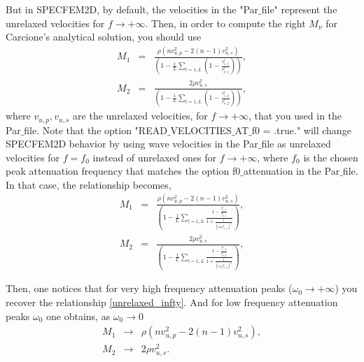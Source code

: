 \documentclass[a4paper,12pt]{article}
\begin{document}
But in SPECFEM2D, by default, the velocities in the "Par$\_$file" represent the unrelaxed velocities for $f\rightarrow+\infty$. Then, in order to compute the right $M_\nu$ for Carcione's analytical solution, you should use
\begin{equation}
\begin{array}{rcl}
M_1 &=& \frac{\rho(nv_{u,p}^2-2(n-1)v_{u,s}^2)}{\left(1-\frac{1}{L}\sum_{l=1,L}(1-\frac{\tau^l_{\epsilon,1}}{\tau^l_{\sigma,1}})\right)},\\
M_2 &=& \frac{2\rho v_{u,s}^2}{\left(1-\frac{1}{L}\sum_{l=1,L}(1-\frac{\tau^l_{\epsilon,2}}{\tau^l_{\sigma,2}})\right)},
\end{array}
\label{unrelaxed_infty}
\end{equation}
where $v_{u,p}, v_{u,s}$ are the unrelaxed velocities, for $f\rightarrow+\infty$, that you used in the Par$\_$file. Note that the option "READ$\_$VELOCITIES$\_$AT$\_$f0 = .true." will change SPECFEM2D behavior by using wave velocities in the Par$\_$file as unrelaxed velocities for $f = f_0$ instead of unrelaxed ones for $f\rightarrow +\infty$, where $f_0$ is the chosen peak attenuation frequency that matches the option f0$\_$attenuation in the Par$\_$file. In that case, the relationship becomes,
\begin{equation}
\begin{array}{rcl}
M_1 &=& \frac{\rho(nv_{u,p}^2-2(n-1)v_{u,s}^2)}{(1 - \frac{1}{L}\sum_{l=1,L}\frac{1-\frac{\tau^l_{\epsilon,1}}{\tau^l_{\sigma,1}}}{1+\frac{1}{(\omega_0\tau^l_{\sigma,1})^2}})},\\
M_2 &=& \frac{2\rho v_{u,s}^2}{(1 - \frac{1}{L}\sum_{l=1,L}\frac{1-\frac{\tau^l_{\epsilon,2}}{\tau^l_{\sigma,2}}}{1+\frac{1}{(\omega_0\tau^l_{\sigma,2})^2}})},
\end{array}
\end{equation}

Then, one notices that for very high frequency attenuation peaks ($\omega_0 \rightarrow +\infty$) you recover the relationship \eqref{unrelaxed_infty}. And for low frequency attenuation peaks $\omega_0$ one obtains, as $\omega_0 \rightarrow 0$
\begin{equation}
\begin{array}{rcl}
M_1 &\rightarrow& \rho(nv_{u,p}^2-2(n-1)v_{u,s}^2),\\
M_2 &\rightarrow& 2\rho v_{u,s}^2.
\end{array}
\end{equation}
\end{document}
